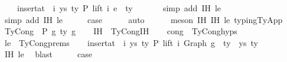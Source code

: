 \begin{isabellebody}
\ \ \ \ {\isachardoublequoteopen}insert{\isacharunderscore}{\kern0pt}at\ {\isasymGamma}\ i\ {\isacharparenleft}{\kern0pt}ys{\isacharcomma}{\kern0pt}\ ty{}{\isacharprime}{\kern0pt}{\isacharparenright}{\kern0pt}\ {\isasymturnstile}{\isacharbraceleft}{\kern0pt}P{\isacharbraceright}{\kern0pt}\ lift\ i\ e{}\ {\isacharcolon}{\kern0pt}\ ty{}{\isachardoublequoteclose}\isanewline
\ \ \ \ \ \isamarkupfalse%
\ {\isacharparenleft}{\kern0pt}simp\ add{\isacharcolon}{\kern0pt}\ IH{}\ le{\isacharparenright}{\kern0pt}\isanewline
\ \ \ \ \ \isamarkupfalse%
\ {\isacharparenleft}{\kern0pt}simp\ add{\isacharcolon}{\kern0pt}\ IH{}\ le{\isacharparenright}{\kern0pt}\isanewline
\isanewline
\ \ \isamarkupfalse%
\ \isamarkupfalse%
\ {\isacharquery}{\kern0pt}case\isanewline
\ \ \ \ \isamarkupfalse%
\ auto\isanewline
\ \ \ \ \isamarkupfalse%
\ {\isacharparenleft}{\kern0pt}meson\ IH{}\ IH{}\ le\ typing{\isachardot}{\kern0pt}TyApp{\isacharparenright}{\kern0pt}\isanewline
\isanewline
{}\isamarkupfalse%
\isanewline
\ \ \isamarkupfalse%
\ {\isacharparenleft}{\kern0pt}TyCong\ {\isasymGamma}\ P\ g{}\ ty\ g{}{\isacharparenright}{\kern0pt}\isanewline
\ \ \isamarkupfalse%
\ IH\ {\isacharequal}{\kern0pt}\ TyCong{\isachardot}{\kern0pt}IH\isanewline
\ \ \isamarkupfalse%
\ cong\ {\isacharequal}{\kern0pt}\ TyCong{\isachardot}{\kern0pt}hyps{\isacharparenleft}{\kern0pt}{}{\isacharparenright}{\kern0pt}\isanewline
\ \ \isamarkupfalse%
\ le\ {\isacharequal}{\kern0pt}\ TyCong{\isachardot}{\kern0pt}prems\isanewline
\isanewline
\ \ \isamarkupfalse%
\ {\isachardoublequoteopen}insert{\isacharunderscore}{\kern0pt}at\ {\isasymGamma}\ i\ {\isacharparenleft}{\kern0pt}ys{\isacharcomma}{\kern0pt}\ ty{}{\isacharprime}{\kern0pt}{\isacharparenright}{\kern0pt}\ {\isasymturnstile}{\isacharbraceleft}{\kern0pt}P{\isacharbraceright}{\kern0pt}\ lift\ i\ {\isacharparenleft}{\kern0pt}Graph\ g{}{\isacharparenright}{\kern0pt}\ {\isacharcolon}{\kern0pt}\ ty{\isachardoublequoteclose}\ \ ys\ ty{}{\isacharprime}{\kern0pt}\isanewline
\ \ \ \ \isamarkupfalse%
\ IH\ le\ \isamarkupfalse%
\ blast\isanewline
\ \ \isamarkupfalse%
\ \isamarkupfalse%
\ {\isacharquery}{\kern0pt}case\isanewline

\end{isabellebody}
